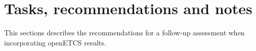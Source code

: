 \section{Tasks, recommendations and notes}

\bigskip

This sections describes the recommendations for a follow-up assessment when incorporating openETCS results.